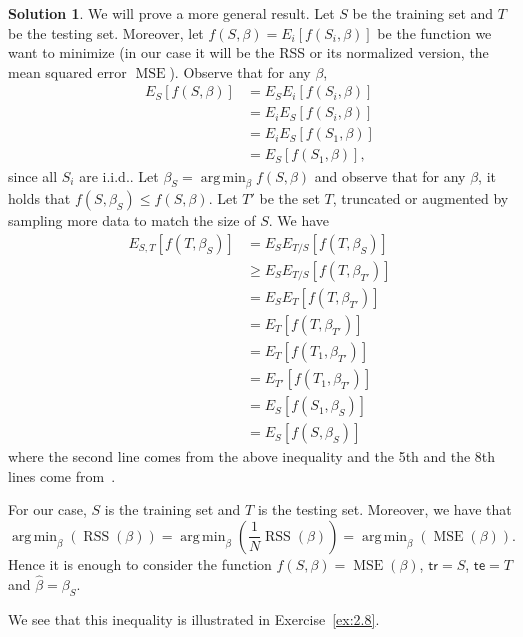 \documentclass[]{book}
\theoremstyle{definition}
\newtheorem*{soln}{Solution}
\DeclareMathOperator*{\argmin}{arg\,min} \DeclareMathOperator*{\Cov}{Cov}
\DeclareMathOperator*{\RSS}{RSS} \DeclareMathOperator*{\WRSS}{WRSS}
\DeclareMathOperator*{\MSE}{MSE} \DeclareMathOperator*{\diag}{diag}
\begin{document}
\begin{enumerate}
	      \begin{soln}
		      We will prove a more general result. Let $S$ be the training set
		      and $T$ be the testing set. Moreover, let
		      $f(S,\beta)=E_i[f(S_i,\beta)]$ be the function we want to minimize
		      (in our case it will be the RSS or its normalized version, the
		      mean squared error $\MSE$). Observe that for any $\beta$,
		      \begin{equation}\label{eq:first is enough}
			      \begin{split}
				      E_S[f(S,\beta)] &= E_SE_i[f(S_i,\beta)] \\
				      &= E_iE_S[f(S_i,\beta)] \\
				      &= E_iE_S[f(S_1,\beta)] \\
				      &= E_S[f(S_1,\beta)],
			      \end{split}
		      \end{equation}
		      since all $S_i$ are i.i.d.. Let $\beta_S = \argmin_\beta
			      f(S,\beta)$ and observe that for any $\beta$, it holds that
		      $f(S,\beta_S)\le f(S,\beta)$. Let $T'$ be the set $T$,
		      truncated or augmented by sampling more data to match the size
		      of $S$. We have
		      \begin{equation}
			      \begin{split}
				      E_{S,T}[f(T,\beta_S)] &= E_S E_{T/S}[f(T,\beta_S)] \\
				      & \ge E_S E_{T/S}[f(T,\beta_{T'})] \\
				      &= E_S E_T[f(T,\beta_{T'})] \\
				      &= E_T[f(T,\beta_{T'})] \\
				      &= E_T[f(T_1,\beta_{T'})] \\
				      &= E_{T'}[f(T_1,\beta_{T'})] \\
				      &= E_S[f(S_1,\beta_S)] \\
				      &= E_S[f(S,\beta_S)]
			      \end{split}
		      \end{equation}
		      where the second line comes from the above inequality and the 5th
		      and the 8th lines come from~.

		      For our case, $S$ is the training set and $T$ is the testing set.
		      Moreover, we have that
		      $$\argmin_\beta(\RSS(\beta))=\argmin_\beta(\frac{1}{N}\RSS(\beta))=\argmin_\beta(\MSE(\beta)).$$
		      Hence it is enough to consider the function
		      $f(S,\beta)=\MSE(\beta)$, $\mathsf{tr}=S$, $\mathsf{te}=T$ and
		      $\hat \beta = \beta_S$.

		      We see that this inequality is illustrated in
		      Exercise~\ref{ex:2.8}.
	      \end{soln}
\end{enumerate}
\end{document}
